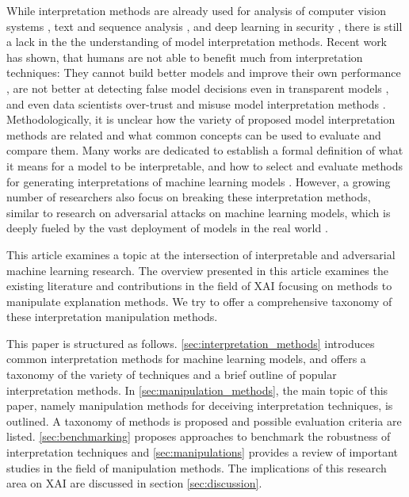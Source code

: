 While interpretation methods are already used for analysis of computer vision systems \cite{bach2015pixel, simonyan2013deep, zeiler2014visualizing}, text and sequence analysis \cite{ancona2017towards, arras2017relevant}, and deep learning in security \cite{evaluating_explanations_security}, there is still a lack in the the understanding of model interpretation methods. 
Recent work has shown, that humans are not able to benefit much from interpretation techniques: They cannot build better models and improve their own performance \cite{hase2020evaluating}, are not better at detecting false model decisions even in transparent models \cite{poursabzi2018manipulating}, and even data scientists over-trust and misuse model interpretation methods \cite{kaur2020interpreting}. 
Methodologically, it is unclear how the variety of proposed model interpretation methods are related and what common concepts can be used to evaluate and compare them. Many works are dedicated to establish a formal definition of what it means for a model to be interpretable, and how to select and evaluate methods for generating interpretations of machine learning models \cite{murdoch2019definitions, lipton2018mythos}. However, a growing number of researchers also focus on breaking these interpretation methods, similar to research on adversarial attacks on machine learning models, which is deeply fueled by the vast deployment of models in the real world \cite{fooling_nn_interpreters,ghorbani2019interpretation,dimanov2020you,dombrowski2019explanations,advlime_aies20, le2020remote, zhang2020interpretable, kuppa2020black, anders2020fairwashing, lakkaraju2020fool, kindermans2017reliability}.

\newline
This article examines a topic at the intersection of interpretable and adversarial machine learning research. 
The overview presented in this article examines the existing literature and contributions in the field of XAI focusing on methods to manipulate explanation methods. We try to offer a comprehensive taxonomy of these interpretation manipulation methods. 

This paper is structured as follows. \autoref{sec:interpretation_methods} introduces common interpretation methods for machine learning models, and offers a taxonomy of the variety of techniques and a brief outline of popular interpretation methods.
In \autoref{sec:manipulation_methods}, the main topic of this paper, namely manipulation methods for deceiving interpretation techniques, is outlined. A taxonomy of methods is proposed and possible evaluation criteria are listed. \autoref{sec:benchmarking} proposes approaches to benchmark the robustness of interpretation techniques and \autoref{sec:manipulations} provides a review of important studies in the field of manipulation methods. The implications of this research area on XAI are discussed in section \autoref{sec:discussion}.
